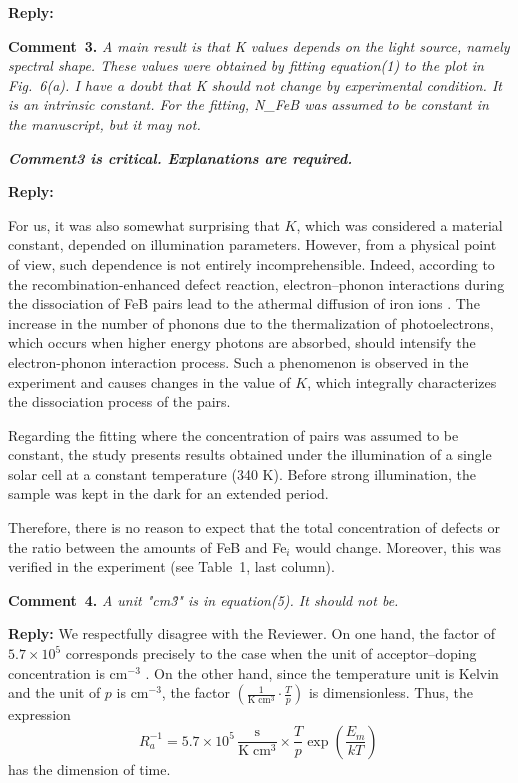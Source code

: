 \documentclass{WileyMSP-template}
\begin{document}
\noindent
\textcolor[rgb]{0.51,0.00,0.00}{\textbf{Reply:}}


\vspace{1cm}
\noindent
\textcolor[rgb]{0.00,0.50,1.00}{\textbf{Comment~3.}}
\emph{A main result is that K values depends on the light source, namely spectral shape.
These values were obtained by fitting equation(1) to the plot in Fig.~6(a).
I have a doubt that K should not change by experimental condition.
It is an intrinsic constant.
For the fitting, N\_FeB was assumed to be constant in the manuscript, but it may not.}

\emph{
\textbf{Comment3 is critical. Explanations are required.}
}

\noindent
\textcolor[rgb]{0.51,0.00,0.00}{\textbf{Reply:}}


For us, it was also somewhat surprising that $K$,
which was considered a material constant, depended on illumination parameters.
However, from a physical point of view, such dependence is not entirely incomprehensible.
Indeed, according to the recombination-enhanced defect reaction,
electron--phonon interactions during the dissociation of FeB pairs lead to the athermal diffusion of iron ions \cite{FeBKin2019,KIMERLINGFeB}.
The increase in the number of phonons due to the thermalization of photoelectrons,
which occurs when higher energy photons are absorbed,
should intensify the electron-phonon interaction process.
Such a phenomenon is observed in the experiment and causes changes in the value of $K$,
which integrally characterizes the dissociation process of the pairs.

Regarding the fitting where the concentration of pairs was assumed to be constant,
the study presents results obtained under the illumination of a single solar cell at a constant temperature (340 K).
Before strong illumination, the sample was kept in the dark for an extended period.

Therefore, there is no reason to expect that the total concentration of defects or the ratio between the amounts
of FeB and Fe$_i$ would change.
Moreover, this was verified in the experiment (see Table~1, last column).


\vspace{1cm}
\noindent
\textcolor[rgb]{0.00,0.50,1.00}{\textbf{Comment~4.}}
\emph{A unit "cm\^3" is in equation(5). It should not be.}

\noindent
\textcolor[rgb]{0.51,0.00,0.00}{\textbf{Reply:}}
We respectfully disagree with the Reviewer.
On one hand, the factor of $5.7\times10^5$
corresponds precisely to the case
when the unit of acceptor--doping concentration is cm$^{-3}$ \cite{FeBAssJAP2014,FeBKin2019,FeBAssSST2011}.
On the other hand,
since the temperature unit is Kelvin
and the unit of $p$ is cm$^{-3}$,
the factor $\left(\frac{1}{\mathrm{K}\;\mathrm{cm}^3}\cdot\frac{T}{p}\right)$ is dimensionless.
Thus, the expression
\begin{equation}
\label{eqTass}
R_a^{-1}=5.7\times10^5\,\frac{\mathrm{s}}{\mathrm{K}\;\mathrm{cm}^3}\times\frac{T}{p}\exp\left(\frac{E_m}{kT}\right)\,
\end{equation}
has the dimension of time.
\end{document}
